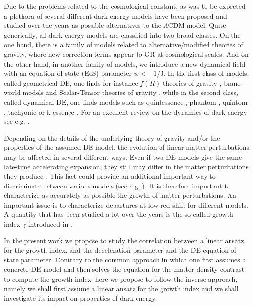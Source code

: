 \documentclass[aps,prd,amsmath,amssymb]{revtex4}
\begin{document}
Due to the problems related to the cosmological constant, as was to be expected a plethora of several different 
dark energy models have been proposed and studied over the years as possible alternatives to the $\Lambda$CDM model. 
Quite generically, all dark energy models are classified into two broad classes. On the one hand, there is a family of models related to alternative/modified theories of gravity, where new correction terms appear to GR at cosmological scales. And on the other hand, in another family of models, we introduce a new dynamical field with an equation-of-state (EoS) parameter $w < -1/3$. In the first class of models, called geometrical DE, one finds for instance $f(R)$ theories of gravity \cite{mod1,mod2,HS,starobinsky}, brane-world models \cite{langlois,maartens,dgp} and Scalar-Tensor theories of gravity \cite{BD1,BD2,leandros,PR}, while in the second class, called dynamical DE, one finds models such as quintessence \cite{DE1}, phantom \cite{DE2,DE3}, quintom \cite{DE4,DE5}, tachyonic \cite{DE6} or k-essence \cite{DE7}. For an excellent 
review on the dynamics of dark energy see e.g. \cite{copeland}. 

\smallskip

Depending on the details of the underlying theory of gravity and/or the properties of the assumed DE model, the evolution
of linear matter perturbations may be affected in several different ways. Even if two DE models give the same late-time accelerating expansion, they still may differ in the matter perturbations they produce \cite{staro,radouane}. This fact
could provide an additional important way to discriminate between various models
(see e.g. \cite{extra1,extra2,extra3,extra4}). It is therefore important to characterize as accurately as possible the growth of matter perturbations. An important issue is to characterize departures at low red-shift for different
models. A quantity that has been studied a lot over the years is the so called growth index $\gamma$ introduced in \cite{gamma}. 

\smallskip

In the present work we propose to study the correlation between a linear ansatz for the growth index, and the deceleration parameter and the DE equation-of-state parameter. Contrary to the common approach in which one first assumes a concrete DE model and then solves the equation for the matter density contrast to compute the growth index, here we propose to follow the inverse approach, namely we shall first assume a linear ansatz for the growth index and we shall investigate its impact
on properties of dark energy.
\end{document}
